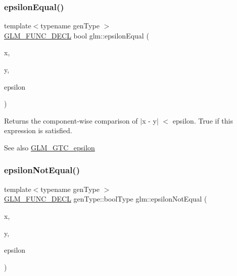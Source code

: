 \subsubsection{\texorpdfstring{epsilon\+Equal()}{epsilonEqual()}\hspace{0.1cm}{\footnotesize\ttfamily [2/2]}}
{\footnotesize\ttfamily template$<$typename gen\+Type $>$ \\
\hyperlink{setup_8hpp_ab2d052de21a70539923e9bcbf6e83a51}{G\+L\+M\+\_\+\+F\+U\+N\+C\+\_\+\+D\+E\+CL} bool glm\+::epsilon\+Equal (\begin{DoxyParamCaption}\item[{gen\+Type const \&}]{x,  }\item[{gen\+Type const \&}]{y,  }\item[{gen\+Type const \&}]{epsilon }\end{DoxyParamCaption})}

Returns the component-\/wise comparison of $\vert$x -\/ y$\vert$ $<$ epsilon. True if this expression is satisfied.

\begin{DoxySeeAlso}{See also}
\hyperlink{group__gtc__epsilon}{G\+L\+M\+\_\+\+G\+T\+C\+\_\+epsilon} 
\end{DoxySeeAlso}
\mbox{\label{group__gtc__epsilon_ga14e2888a304654ade8a3996024e2739c}} 
\subsubsection{\texorpdfstring{epsilon\+Not\+Equal()}{epsilonNotEqual()}\hspace{0.1cm}{\footnotesize\ttfamily [1/2]}}
{\footnotesize\ttfamily template$<$typename gen\+Type $>$ \\
\hyperlink{setup_8hpp_ab2d052de21a70539923e9bcbf6e83a51}{G\+L\+M\+\_\+\+F\+U\+N\+C\+\_\+\+D\+E\+CL} gen\+Type\+::bool\+Type glm\+::epsilon\+Not\+Equal (\begin{DoxyParamCaption}\item[{gen\+Type const \&}]{x,  }\item[{gen\+Type const \&}]{y,  }\item[{typename gen\+Type\+::value\+\_\+type const \&}]{epsilon }\end{DoxyParamCaption})}

